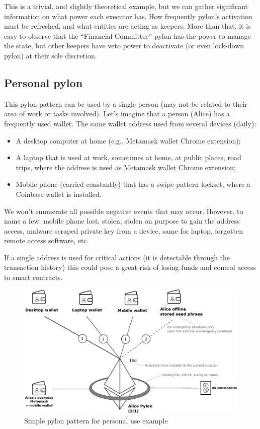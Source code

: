 \documentclass[12pt]{article}
\begin{document}
This is a trivial, and slightly theoretical example, but we can gather significant information on what power each executor has. How frequently pylon's activation must be refreshed, and what entities are acting as keepers. More than that, it is easy to observe that the ``Financial Committee'' pylon has the power to manage the state, but other keepers have veto power to deactivate (or even lock-down pylon) at their sole discretion.


\pagebreak
\subsection{Personal pylon}

This pylon pattern can be used by a single person (may not be related to their area of work or tasks involved). Let's imagine that a person (Alice) has a frequently used wallet. The same wallet address used from several devices (daily):
\begin{itemize}
\item{A desktop computer at home (e.g., Metamask wallet Chrome extension);}
\item{A laptop that is used at work, sometimes at home, at public places, road trips, where the address is used as Metamask wallet Chrome extension;}
\item{Mobile phone (carried constantly) that has a swipe-pattern lockset, where a Coinbase wallet is installed.}
\end{itemize}


\medskip
We won’t enumerate all possible negative events that may occur. However, to name a few: mobile phone lost, stolen, stolen on purpose to gain the address access, malware scraped private key from a device, same for laptop, forgotten remote access software, etc.

\medskip
If a single address is used for critical actions (it is detectable through the transaction history) this could pose a great risk of losing funds and control access to smart contracts.


\begin{figure}[h!]
  \hspace*{-1cm}
    \includegraphics[width=1.15\textwidth]{pylon_example_personal_pylon.pdf}
    \caption[Figure 1]{Simple pylon pattern for personal use example\label{fig:pylon_personal_example}}
\end{figure}
\end{document}
